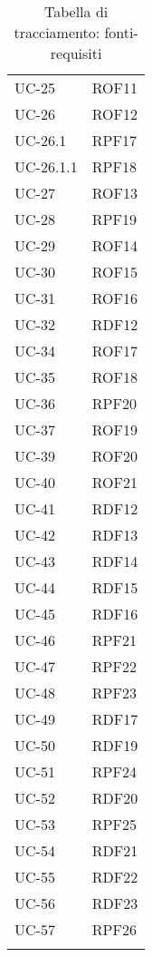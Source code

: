 \begin{longtable}{| p{5cm} | p{5cm} |}
		UC-25 & ROF11 \\
		\rowcolor{LightGray}
		UC-26 & ROF12 \\
		UC-26.1 & RPF17 \\
		\rowcolor{LightGray}
		UC-26.1.1 & RPF18\\
		UC-27 & ROF13 \\
		\rowcolor{LightGray}
		UC-28 & RPF19 \\
		UC-29 & ROF14 \\
		\rowcolor{LightGray}
		UC-30 & ROF15 \\
		UC-31 & ROF16 \\
		\rowcolor{LightGray}
		UC-32 & RDF12\\
		UC-34 & ROF17\\
		\rowcolor{LightGray}
		UC-35 & ROF18\\
		UC-36 & RPF20\\
		\rowcolor{LightGray}
		UC-37 & ROF19\\
		UC-39 & ROF20\\
		\rowcolor{LightGray}
		UC-40 & ROF21\\
		UC-41 & RDF12\\
		\rowcolor{LightGray}
		UC-42 & RDF13\\
		UC-43 & RDF14\\
		\rowcolor{LightGray}
		UC-44 & RDF15\\
		UC-45 & RDF16\\
		\rowcolor{LightGray}
		UC-46 & RPF21\\
		UC-47 & RPF22\\
		\rowcolor{LightGray}
		UC-48 & RPF23\\
		UC-49 & RDF17 \\
		\rowcolor{LightGray}
		UC-50 & RDF19 \\
		UC-51 & RPF24 \\
		\rowcolor{LightGray}
		UC-52 & RDF20 \\
		UC-53 & RPF25 \\
		\rowcolor{LightGray}
		UC-54 & RDF21 \\
		UC-55 & RDF22 \\
		\rowcolor{LightGray}
		UC-56 & RDF23 \\
		UC-57 & RPF26 \\
		\rowcolor{LightGray}
		\hline
		\caption{Tabella di tracciamento: fonti-requisiti}
\end{longtable}
\newpage
